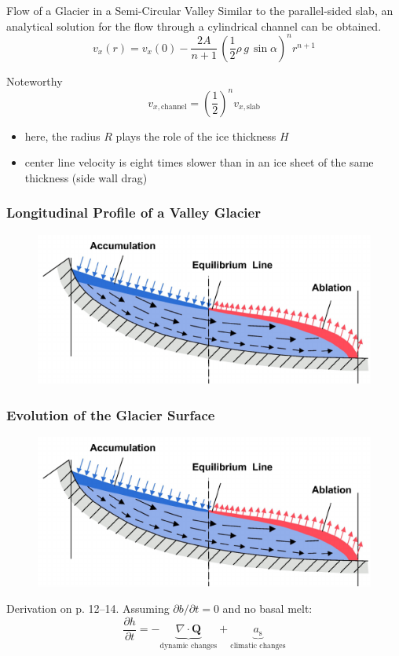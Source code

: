 \documentclass[hide notes,intlimits,unknownkeysallowed]{beamer}
\begin{document}
\begin{frame}{Flow of a Glacier in a Semi-Circular Valley}
 Similar to the parallel-sided slab, an analytical solution for the flow through a cylindrical channel can be obtained.
\begin{equation*}
v_x (r) = v_x (0) - \frac{2A}{n+1}\,\left( \frac{1}{2}\rho\,g\,\sin\alpha\right)^{n} r^{n+1}
\end{equation*}
\begin{block}{Noteworthy}
\begin{equation*}
v_{x, \text{channel}} = \left(\frac{1}{2}\right)^{n} v_{x, \text{slab}}
\end{equation*}
\begin{itemize}
\item here, the radius $R$ plays the role of the ice thickness $H$
\item center line velocity is \alert{eight} times slower than in an
  ice sheet of the same thickness (side wall drag)
\end{itemize}
\end{block}
\end{frame}


\begin{frame}
  \frametitle{Longitudinal Profile of a Valley Glacier}
  \begin{figure}
    \includegraphics[width=\textwidth]{figures/flow_acc_abl}
  \end{figure}
\end{frame}

\begin{frame}
  \frametitle{Evolution of the Glacier Surface}
  \begin{figure}
    \includegraphics[width=.65\textwidth]{figures/flow_acc_abl}
  \end{figure}
  Derivation on p. 12--14. Assuming $\partial b / \partial t = 0$ and no basal melt:
  \begin{equation*}
    \frac{\partial h}{\partial t} = - \underbrace{\nabla \cdot \mathbf{Q}}_{\text{dynamic changes}} + \underbrace{a_{\text{s}}}_{\text{climatic changes}}
  \end{equation*}
\end{frame}
\end{document}
